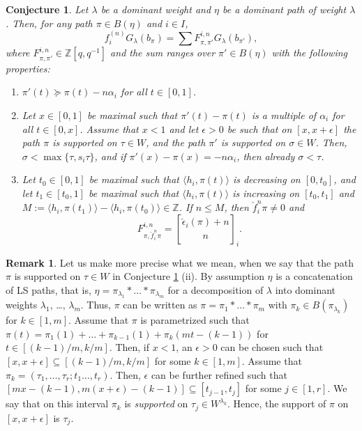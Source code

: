 \documentclass[final]{amsart}
\theoremstyle{plain}
\newtheorem{conjecture}[corollary]{Conjecture}
\theoremstyle{definition}
\newtheorem{remark}[corollary]{Remark}
\newcommand{\qbinom}{\genfrac{[}{]}{0pt}{}}
\newcommand{\bbZ}{\mathbb Z}
\newcommand{\cf}{\check{f}}
\newcommand{\cepsilon}{\check{\epsilon}}
\begin{document}
\begin{conjecture}
    \label{conjecture:f-action}
    Let $\lambda$ be a dominant weight and $\eta$ be a dominant path of weight $\lambda$.
    Then, for any path $\pi \in B(\eta)$ and $i \in I$,
    \[
        f_i^{(n)} G_\lambda(b_\pi) = \sum F_{\pi,\pi'}^{i,n} G_\lambda(b_{\pi'}),
    \]
    where $F_{\pi,\pi'}^{i,n} \in \bbZ[q, q^{-1}]$ and the sum ranges over $\pi' \in B(\eta)$ with the following properties:
    \begin{enumerate}
        \item $\pi'(t) \succeq \pi(t) - n\alpha_i$ for all $t \in [0, 1]$.
        \item Let $x \in [0, 1]$ be maximal such that $\pi'(t) - \pi(t)$ is a multiple of $\alpha_i$ for all $t \in [0, x]$.
        Assume that $x < 1$ and let $\epsilon > 0$ be such that on $[x, x+\epsilon]$ the path $\pi$ is supported on $\tau \in W$, and the path $\pi'$ is supported on $\sigma \in W$.
        Then, $\sigma < \max\{\tau, s_i\tau\}$, and if $\pi'(x) - \pi(x) = -n\alpha_i$, then already $\sigma < \tau$.
        \item Let $t_0 \in [0, 1]$ be maximal such that $\langle h_i, \pi(t)\rangle$ is decreasing on $[0, t_0]$, and let $t_1 \in [t_0, 1]$ be maximal such that $\langle h_i, \pi(t)\rangle$ is increasing on $[t_0, t_1]$ and $M := \langle h_i, \pi(t_1)\rangle - \langle h_i, \pi(t_0)\rangle \in \bbZ$.
        If $n \le M$, then $\cf_i^n\pi \neq 0$ and
        \[
            F_{\pi,\cf_i^n\pi}^{i,n} = \qbinom{\cepsilon_i(\pi)+n}{n}_i.
        \]
    \end{enumerate}
\end{conjecture}

\begin{remark}
    Let us make more precise what we mean, when we say that the path $\pi$ is supported on $\tau \in W$ in Conjecture \ref{conjecture:f-action} (ii).
    By assumption $\eta$ is a concatenation of LS paths, that is, $\eta = \pi_{\lambda_1} * \dots * \pi_{\lambda_m}$ for a decomposition of $\lambda$ into dominant weights $\lambda_1$, \dots, $\lambda_m$.
    Thus, $\pi$ can be written as $\pi = \pi_1 * \dots * \pi_m$ with $\pi_k \in B(\pi_{\lambda_k})$ for $k  \in [1, m]$.
    Assume that $\pi$ is parametrized such that $\pi(t) = \pi_1(1) + \dots + \pi_{k-1}(1) + \pi_k(mt - (k-1))$ for $t \in [(k-1)/m, k/m]$.
    Then, if $x < 1$, an $\epsilon > 0$ can be chosen such that $[x, x+\epsilon] \subseteq [(k-1)/m, k/m]$ for some $k \in [1, m]$.
    Assume that $\pi_k = (\tau_1, \dots, \tau_r; t_1 \dots, t_r)$.
    Then, $\epsilon$ can be further refined such that $[mx-(k-1), m(x+\epsilon)-(k-1)] \subseteq [t_{j-1}, t_j]$ for some $j \in [1, r]$.
    We say that on this interval $\pi_k$ is \emph{supported} on $\tau_j \in W^{\lambda_k}$.
    Hence, the support of $\pi$ on $[x, x+\epsilon]$ is $\tau_j$.
\end{remark}
\end{document}
